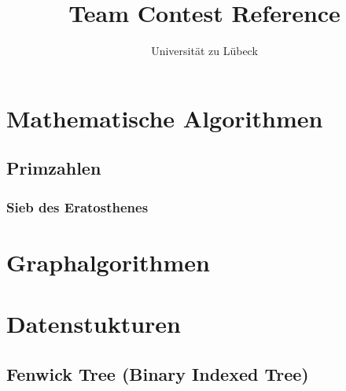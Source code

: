 \documentclass[10pt,a4paper,ngerman]{article}
\title{Team Contest Reference}
\author{Universität zu Lübeck}
\begin{document}
\lstset{basicstyle=\ttfamily\footnotesize,numbers=left,numberstyle=\tiny,tabsize=2,numbersep=5pt}
\maketitle

\section{Mathematische Algorithmen}
\subsection{Primzahlen}
\subsubsection{Sieb des Eratosthenes}


\section{Graphalgorithmen}
\section{Datenstukturen}
\subsection{Fenwick Tree (Binary Indexed Tree)}

\end{document}
